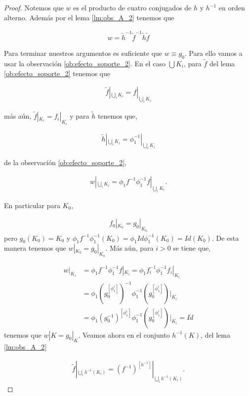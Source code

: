 \documentclass{subfiles}
\begin{document}
\begin{proof}
Notemos que $w$ es el producto de cuatro conjugados de $h$ y $h^{-1}$ en orden alterno. Además por el lema \ref{lm:obs_A_2} tenemos que

\begin{align*}
w =\tilde{h}^{-1}\tilde{f}^{-1}\tilde{h}\tilde{f}
\end{align*}

Para terminar nuestros argumentos es suficiente que $w \equiv g_0$. Para ello vamos a usar la observación \ref{ob:efecto_soporte_2}. En el caso $\bigcup K_i$, para $\tilde{f}$ del lema \ref{ob:efecto_soporte_2} tenemos que  

\begin{align*}
\tilde{f}|_{\bigcup_i K_i} = f|_{\bigcup_i K_i}
\end{align*}

más aún, $\tilde{f}|_{K_i} = f_i|_{K_i}$ y  para $\tilde{h}$ tenemos que,

\begin{align*}
\tilde{h}|_{\bigcup_i K_i}=\phi_1^{-1}|_{\bigcup_i K_i}
\end{align*}

de la observación \ref{ob:efecto_soporte_2},


\begin{align*}
w|_{\bigcup_i K_i} = \phi_1f^{-1}\phi_1^{-1}f|_{\bigcup_i K_i}.
\end{align*}

En particular para $K_0$,

\begin{align*}
f_0|_{K_0}=g_0|_{K_0}
\end{align*}
pero $g_0(K_0)=K_0$ y $\phi_1f^{-1}\phi_1^{-1}(K_0)=\phi_1Id\phi_1^{-1}(K_{0})=Id(K_0)$. De esta manera tenemos que $w|_{K_0}=g_0|_{K_0}.$ Más aún, para $i>0$ se tiene que,

\begin{align*}
w|_{K_i} & = \phi_1f^{-1}\phi_1^{-1}f|_{ K_i}=\phi_1f_i^{-1}\phi_1^{-1}f_i|_{ K_i} \\
& = \phi_1(g_0^{[\phi_1^i]})^{-1}\phi_1^{-1}(g_0^{[\phi_1^i]})|_{ K_i}\\
& = \phi_1(g_0^{-1})^{[\phi_1^i]}\phi_1^{-1}(g_0^{[\phi_1^i]})|_{ K_i}=Id
\end{align*} 
tenemos que $w|K=g_0|_K.$ Veamos ahora en el conjunto $h^{-1}(K)$, del lema \ref{lm:obs_A_2}

\begin{align*}
\tilde{f}|_{\bigcup_i h^{-1}(K_i)} = (f^{-1})^{[h^{-1}]}|_{\bigcup_i h^{-1}(K_i)}.
\end{align*}


\end{proof}
\end{document}
